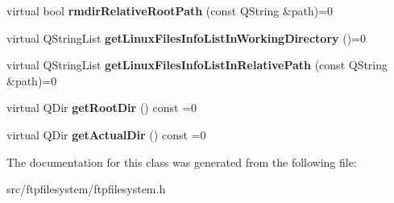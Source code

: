 \begin{DoxyCompactItemize}
virtual bool {\bfseries rmdir\+Relative\+Root\+Path} (const Q\+String \&path)=0
\item 
\mbox{\label{classInterfaceFTPfileSystem_a41b8ae07679067b4271d5435a8416ebf}} 
virtual Q\+String\+List {\bfseries get\+Linux\+Files\+Info\+List\+In\+Working\+Directory} ()=0
\item 
\mbox{\label{classInterfaceFTPfileSystem_a01b1cd4f92a23fe9659102b82d11135c}} 
virtual Q\+String\+List {\bfseries get\+Linux\+Files\+Info\+List\+In\+Relative\+Path} (const Q\+String \&path)=0
\item 
\mbox{\label{classInterfaceFTPfileSystem_a798f5c44f6b41df61da64f24824edf36}} 
virtual Q\+Dir {\bfseries get\+Root\+Dir} () const =0
\item 
\mbox{\label{classInterfaceFTPfileSystem_a660fbd9b5c7eb9b71a490aaa314ab1ac}} 
virtual Q\+Dir {\bfseries get\+Actual\+Dir} () const =0
\end{DoxyCompactItemize}


The documentation for this class was generated from the following file\+:\begin{DoxyCompactItemize}
\item 
src/ftpfilesystem/ftpfilesystem.\+h\end{DoxyCompactItemize}
